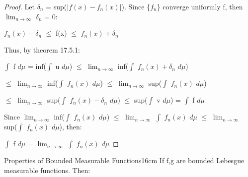     \begin{proof}
        Let $\delta_n$ = sup($|f(x) - f_n(x)|$).
        Since \{$f_n$\} converge uniformly f, then
        $\lim_{n \rightarrow \infty}$ $\delta_n$ = 0:

        \hspace{0.5cm}
        $f_n(x) - \delta_n$ $\leq$ f(x) $\leq$ $f_n(x) + \delta_n$

        Thus, by {\color{red} theorem 17.5.1}:

        \hspace{0.5cm}
        $\int$ f $d\mu$
        = inf($\int$ u $d\mu$)
        $\leq$ $\lim_{n \rightarrow \infty}$ inf($\int$ $f_n(x) + \delta_n$ $d\mu$)

        \hspace{0.5cm}
        $\leq$ $\lim_{n \rightarrow \infty}$ inf($\int$ $f_n(x)$ $d\mu$)
        $\leq$ $\lim_{n \rightarrow \infty}$ sup($\int$ $f_n(x)$ $d\mu$)

        \hspace{0.5cm}
        $\leq$ $\lim_{n \rightarrow \infty}$ sup($\int$ $f_n(x) - \delta_n$ $d\mu$)
        $\leq$ sup($\int$ v $d\mu$)
        = $\int$ f $d\mu$

        Since
        $\lim_{n \rightarrow \infty}$ inf($\int$ $f_n(x)$ $d\mu$)
        $\leq$ $\lim_{n \rightarrow \infty}$ $\int$ $f_n(x)$ $d\mu$
        $\leq$ $\lim_{n \rightarrow \infty}$ sup($\int$ $f_n(x)$ $d\mu$),
        then:

        \hspace{0.5cm}
        $\int$ f $d\mu$
        = $\lim_{n \rightarrow \infty}$ $\int$ $f_n(x)$ $d\mu$
    \end{proof}

    \vspace{0.5cm}



    \begin{wtheorem}{Properties of Bounded Measurable Functions}{16cm}
        If f,g are bounded Lebesgue measurable functions. Then:
    \end{wtheorem}

